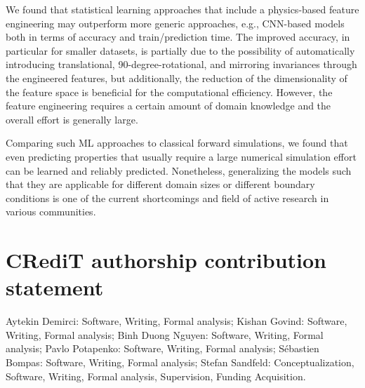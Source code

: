 \documentclass[11pt, authoryear]{elsarticle}
\begin{document}
	We found that statistical learning approaches that include a physics-based
	feature engineering may outperform more generic approaches, e.g., CNN-based
	models both in terms of accuracy and train/prediction time. The improved
	accuracy, in particular for smaller datasets, is partially due to the possibility of 
	automatically introducing translational, 90-degree-rotational, and mirroring invariances through the engineered features, but additionally, the reduction
	of the dimensionality of the feature space is beneficial for the computational
	efficiency. However, the feature engineering requires a certain
	amount of domain knowledge and the overall effort is generally large.
	
	Comparing such \gls{ML} approaches to classical forward simulations, we
	found that even predicting properties that usually
	require a large numerical simulation effort can be learned and reliably 
	predicted. Nonetheless, generalizing the models such that they are applicable 
	for different domain sizes or different boundary conditions is one of the 
	current shortcomings and field of active research in various communities.
	
	
	
	
	\section*{CRediT authorship contribution statement}\noindent
	{Aytekin Demirci}: Software, Writing, Formal analysis;
	{Kishan Govind}: Software, Writing, Formal analysis;
	{Binh Duong Nguyen}: Software, Writing, Formal analysis;
	{Pavlo Potapenko}: Software, Writing, Formal analysis;
	{S\'ebastien Bompas}: Software, Writing, Formal analysis;
	{Stefan Sandfeld}: Conceptualization, Software, Writing, Formal analysis, Supervision, Funding Acquisition.
	
\end{document}
